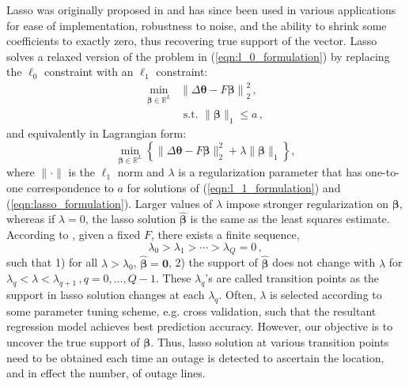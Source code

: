 Lasso was originally proposed in \cite{tibshirani1996regression} and has since been used in various applications for ease of implementation, robustness to noise, and the ability to shrink some coefficients to exactly zero, thus recovering true support of the vector. Lasso solves a relaxed version of the problem in (\ref{eqn:l_0_formulation}) by replacing the $\ell_0$ constraint with an $\ell_1$ constraint:
\begin{align}
\label{eqn:l_1_formulation}
\underset{\boldsymbol{\beta}  \in \mathbb{R}^{L} }{\min} &\left\|\Delta\boldsymbol{\theta} - F\boldsymbol{\beta}\right\|_{2}^{2} \,, \\
& \text { s.t. }\|\boldsymbol{\beta}\|_{1} \le a \nonumber\,,
\end{align}
and equivalently in Lagrangian form:
\begin{equation}
\label{eqn:lasso_formulation}
\min_{\boldsymbol{\beta} \in \mathbb{R}^{L}}\left\{\|\Delta\boldsymbol{\theta} - F\boldsymbol{\beta}\|_{2}^{2}+\lambda\|\boldsymbol{\beta}\|_{1}\right\},
\end{equation}
where $\|\cdot\|$ is the $\ell_1$ norm and $\lambda$ is a regularization parameter that has one-to-one correspondence to $a$ for solutions of (\ref{eqn:l_1_formulation}) and (\ref{eqn:lasso_formulation}). Larger values of $\lambda$ impose stronger regularization on $\boldsymbol{\beta}$, whereas if $\lambda = 0$, the lasso solution $\boldsymbol{\hat{\beta}}$ is the same as the least squares estimate. According to \cite{zou2007degrees}, given a fixed $F$, there exists a finite sequence,
\begin{equation}
\label{eqn:transition_points}
\lambda_0 > \lambda_1 > \cdots > \lambda_Q = 0 \,,
\end{equation}
such that 1) for all $\lambda > \lambda_0$, $\boldsymbol{\hat{\beta}} = \mathbf{0}$, 2) the support of $\boldsymbol{\hat{\beta}}$ does not change with $\lambda$ for $\lambda_q < \lambda < \lambda_{q+1}\,, q=0, \dots, Q-1$. These $\lambda_q$'s are called transition points as the support in lasso solution changes at each $\lambda_q$. Often, $\lambda$ is selected according to some parameter tuning scheme, e.g. cross validation, such that the resultant regression model achieves best prediction accuracy. However, our objective is to uncover the true support of $\boldsymbol{\beta}$. Thus, lasso solution at various transition points need to be obtained each time an outage is detected to ascertain the location, and in effect the number, of outage lines. 

